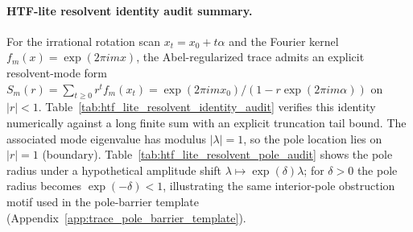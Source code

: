\paragraph{HTF-lite resolvent identity audit summary.} \AuditTag For the irrational rotation scan $x_t=x_0+t\alpha$ and the Fourier kernel $f_m(x)=\exp(2\pi i m x)$, the Abel-regularized trace admits an explicit resolvent-mode form $S_m(r)=\sum_{t\ge 0} r^t f_m(x_t)=\exp(2\pi i m x_0)/(1-r\exp(2\pi i m\alpha))$ on $|r|<1$. Table~\ref{tab:htf_lite_resolvent_identity_audit} verifies this identity numerically against a long finite sum with an explicit truncation tail bound. The associated mode eigenvalue has modulus $|\lambda|=1$, so the pole location lies on $|r|=1$ (boundary). Table~\ref{tab:htf_lite_resolvent_pole_audit} shows the pole radius under a hypothetical amplitude shift $\lambda\mapsto \exp(\delta)\lambda$; for $\delta>0$ the pole radius becomes $\exp(-\delta)<1$, illustrating the same interior-pole obstruction motif used in the pole-barrier template (Appendix~\ref{app:trace_pole_barrier_template}).